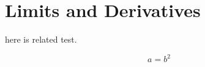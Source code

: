 \chapter{Limits and Derivatives}\label{chap:chap2}

here is related test.

\begin{equation*}
    a = b^2
\end{equation*}